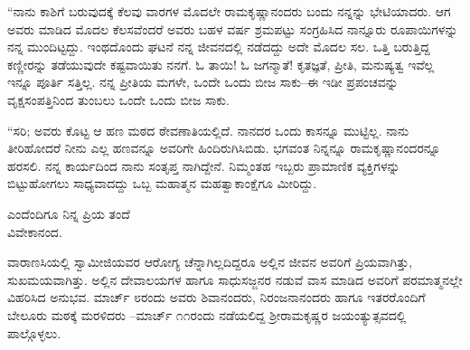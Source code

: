 “ನಾನು ಕಾಶಿಗೆ ಬರುವುದಕ್ಕೆ ಕೆಲವು ವಾರಗಳ ಮೊದಲೇ ರಾಮಕೃಷ್ಣಾನಂದರು ಬಂದು ನನ್ನನ್ನು ಭೇಟಿಯಾದರು. ಆಗ ಅವರು ಮಾಡಿದ ಮೊದಲ ಕೆಲಸವೆಂದರೆ ಅವರು ಬಹಳ ವರ್ಷ ಶ್ರಮಪಟ್ಟು ಸಂಗ್ರಹಿಸಿದ ನಾನ್ನೂರು ರೂಪಾಯಿಗಳನ್ನು ನನ್ನ ಮುಂದಿಟ್ಟದ್ದು. ಇಂಥದೊಂದು ಘಟನೆ ನನ್ನ ಜೀವನದಲ್ಲಿ ನಡೆದದ್ದು ಅದೇ ಮೊದಲ ಸಲ. ಒತ್ತಿ ಬರುತ್ತಿದ್ದ ಕಣ್ಣೀರನ್ನು ತಡೆಯುವುದೇ ಕಷ್ಟವಾಯಿತು ನನಗೆ. ಓ ತಾಯಿ! ಓ ಜಗನ್ಮಾತೆ! ಕೃತಜ್ಞತೆ, ಪ್ರೀತಿ, ಮನುಷ್ಯತ್ವ ಇವೆಲ್ಲ ಇನ್ನೂ ಪೂರ್ತಿ ಸತ್ತಿಲ್ಲ. ನನ್ನ ಪ್ರೀತಿಯ ಮಗಳೇ, ಒಂದೇ ಒಂದು ಬೀಜ ಸಾಕು–ಈ ಇಡೀ ಪ್ರಪಂಚವನ್ನು ವೃಕ್ಷಸಂಪತ್ತಿನಿಂದ ತುಂಬಲು ಒಂದೇ ಒಂದು ಬೀಜ ಸಾಕು.

“ಸರಿ; ಅವರು ಕೊಟ್ಟ ಆ ಹಣ ಮಠದ ಠೇವಣಾತಿಯಲ್ಲಿದೆ. ನಾನದರ ಒಂದು ಕಾಸನ್ನೂ ಮುಟ್ಟಿಲ್ಲ. ನಾನು ತೀರಿಹೋದರೆ ನೀನು ಎಲ್ಲ ಹಣವನ್ನೂ ಅವರಿಗೇ ಹಿಂದಿರುಗಿಸಿಬಿಡು. ಭಗವಂತ ನಿನ್ನನ್ನೂ ರಾಮಕೃಷ್ಣಾನಂದರನ್ನೂ ಹರಸಲಿ. ನನ್ನ ಕಾರ್ಯದಿಂದ ನಾನು ಸಂತೃಪ್ತ ನಾಗಿದ್ದೇನೆ. ನಿಮ್ಮಂತಹ ಇಬ್ಬರು ಪ್ರಾಮಾಣಿಕ ವ್ಯಕ್ತಿಗಳನ್ನು ಬಿಟ್ಟುಹೋಗಲು ಸಾಧ್ಯವಾದದ್ದು ಒಬ್ಬ ಮಹಾತ್ಮನ ಮಹತ್ವಾಕಾಂಕ್ಷೆಗೂ ಮೀರಿದ್ದು.

\begin{flushright}
ಎಂದೆಂದಿಗೂ ನಿನ್ನ ಪ್ರಿಯ ತಂದೆ\\ವಿವೇಕಾನಂದ.
\end{flushright}

ವಾರಾಣಸಿಯಲ್ಲಿ ಸ್ವಾಮೀಜಿಯವರ ಆರೋಗ್ಯ ಚೆನ್ನಾಗಿಲ್ಲದಿದ್ದರೂ ಅಲ್ಲಿನ ಜೀವನ ಅವರಿಗೆ ಪ್ರಿಯವಾಗಿತ್ತು, ಸುಖಮಯವಾಗಿತ್ತು. ಅಲ್ಲಿನ ದೇವಾಲಯಗಳ ಹಾಗೂ ಸಾಧುಸಜ್ಜನರ ನಡುವೆ ವಾಸ ಮಾಡಿದ ಅವರಿಗೆ ಪರಮಾತ್ಮನಲ್ಲೇ ವಿಹರಿಸಿದ ಅನುಭವ. ಮಾರ್ಚ್ ೮ರಂದು ಅವರು ಶಿವಾನಂದರು, ನಿರಂಜನಾನಂದರು ಹಾಗೂ ಇತರರೊಂದಿಗೆ ಬೇಲೂರು ಮಠಕ್ಕೆ ಮರಳಿದರು –ಮಾರ್ಚ್ ೧೧ರಂದು ನಡೆಯಲಿದ್ದ ಶ್ರೀರಾಮಕೃಷ್ಣರ ಜಯಂತ್ಯುತ್ಸವದಲ್ಲಿ ಪಾಲ್ಗೊಳ್ಳಲು.

